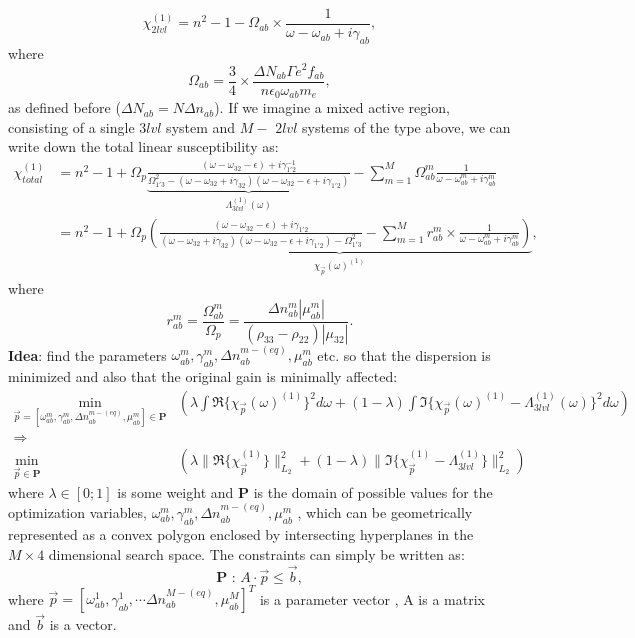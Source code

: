 \documentclass[10pt,letterpaper]{article}
\def\bm{\mathbf}
\begin{document}
	\begin{equation}
	\chi_{2lvl}^{(1)} = n^2-1-\Omega_{ab} \times \frac{1}{\omega - \omega_{ab} + i\gamma_{ab}},
	\end{equation}
	where
	$$\Omega_{ab} = \frac{3}{4}\times \frac{\Delta N_{ab}\Gamma e^2f_{ab}}{n\epsilon_0\omega_{ab}m_e},  $$
	as defined before ($\Delta N_{ab} = N \Delta n_{ab}$). If we imagine a mixed active region, consisting of a single $3lvl$ system and $M-$ $2lvl$ systems of the type above, we can write down the total linear susceptibility as:
	\begin{align}
	\label{eq:totalsusceptibility}
	\chi_{total}^{(1)} &= n^2-1 + \Omega_p \underbrace{\frac{(\omega-\omega_{32}-\epsilon)+i\gamma_{1'2}^{-1}}{\Omega_{1'3}^2-(\omega-\omega_{32}+i\gamma_{32})(\omega-\omega_{32}-\epsilon+i\gamma_{1'2})}}_{\Lambda_{3lvl}^{(1)}(\omega)} - \sum_{m=1}^{M} \Omega_{ab}^{m} \frac{1}{\omega - \omega_{ab}^{m} + i\gamma_{ab}^{m}} \nonumber \\
	&= n^2-1 + \Omega_p \underbrace{ \left  (\frac{(\omega-\omega_{32}-\epsilon)+i\gamma_{1'2} }{(\omega-\omega_{32}+i\gamma_{32})(\omega-\omega_{32}-\epsilon+i\gamma_{1'2})-\Omega_{1'3}^2} - \sum_{m=1}^{M} r_{ab}^{m}  \times \frac{1}{\omega - \omega_{ab}^{m} + i\gamma_{ab}^{m}} \right )}_{\chi_{\vec{p}}(\omega)^{(1)}},	
	\end{align}
	where 
	$$
	r_{ab}^{m} = \frac{\Omega_{ab}^{m}}{\Omega_p} = \frac{\Delta n_{ab}^{m} |\mu_{ab}^{m}|}{(\rho_{33}-\rho_{22})|\mu_{32}|}.
	$$
	\noindent
	\textbf{Idea}: find the parameters $\omega_{ab}^{m},\gamma_{ab}^{m}, \Delta n_{ab}^{m-(eq)},\mu_{ab}^{m}$ etc. so that the dispersion is minimized and also that the original gain is minimally affected: 
	\begin{align}
	\min_{\vec{p}=[\omega_{ab}^{m},\gamma_{ab}^{m}, \Delta n_{ab}^{m-(eq)},\mu_{ab}^{m}] \in \bm{P}} & \left ( \lambda \int{\Re\{\chi_{\vec{p}}(\omega)^{(1)}\}^2 d\omega} + (1-\lambda)\int{ \Im\{\chi_{\vec{p}}(\omega)^{(1)} - \Lambda_{3lvl}^{(1)}(\omega)\}^2 d\omega} \right ) \nonumber \\
	\Rightarrow \nonumber \\
	\min_{ {\vec{p}} \in \bm{P}} & \left ( \lambda \|\Re\{\chi_{\vec{p}}^{(1)}\}\|_{L_2}^2  + (1-\lambda)\| \Im\{\chi_{\vec{p}}^{(1)} - \Lambda_{3lvl}^{(1)}\}\|_{L_2}^2   \right )
	\end{align}
	where $\lambda \in [0;1]$ is some weight and $\bm{P}$ is the domain of possible values for the optimization variables,  $\omega_{ab}^{m},\gamma_{ab}^{m}, \Delta n_{ab}^{m-(eq)},\mu_{ab}^{m}$ , which can be geometrically represented as a convex polygon enclosed by intersecting hyperplanes in the $M\times4$ dimensional search space. The constraints can simply be written as:
	$$
	\bm{P} \text{ : }  A\cdot \vec{p} \leq \vec{b},
	$$
	where $\vec{p} = [\omega_{ab}^{1},\gamma_{ab}^{1},\cdots \Delta n_{ab}^{M-(eq)},\mu_{ab}^{M}]^T$ is a parameter vector , A is a matrix and $\vec{b}$ is a vector.  
	
\end{document}
